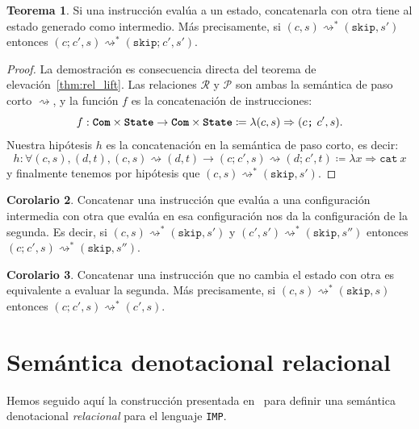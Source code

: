 \documentclass[
  a4paper, 
  10pt, 
  parskip=half, 
  toc=bibliography,
]{scrbook}
\theoremstyle{definition}
\theoremstyle{bolddef}
\newtheorem{theorem}{Teorema}[section]
\newtheorem{corollary}[theorem]{Corolario}
\newcommand{\funfont}[1]{\texttt{#1}}
\newcommand{\tyfont}[1]{\texttt{\textbf{#1}}}
\renewcommand{\mapsto}{\Rightarrow}
\newcommand{\ImpConcat}[2]{{#1} \texttt{;} \ {#2}}
\newcommand{\ImpSkip}{\texttt{skip}}
\newcommand{\ImpName}{\texttt{IMP}}
\begin{document}
\begin{theorem}
  Si una instrucción evalúa a un estado, concatenarla con otra tiene al estado 
  generado como intermedio. Más precisamente, si \((c, s) \rightsquigarrow^* (\ImpSkip, s')\)
  entonces \((\ImpConcat{c}{c'}, s) \rightsquigarrow^* (\ImpConcat{\ImpSkip}{c'}, s')\).
\end{theorem}

\begin{proof}
  La demostración es consecuencia directa del teorema de elevación~\ref{thm:rel_lift}.
  Las relaciones \(\mathcal{R}\) y \(\mathcal{P}\) son ambas la semántica de paso corto
  \(\rightsquigarrow\), y la función \(f\) es la concatenación de instrucciones:
  \[f: \tyfont{Com} \times \tyfont{State} \to \tyfont{Com} \times \tyfont{State} \coloneqq \lambda (c, s) \mapsto (\ImpConcat{c}{c'}, s).\]
  Nuestra hipótesis \(h\) es la concatenación en la semántica de paso corto, es decir:
  \[h: \forall (c, s), (d, t), (c, s) \rightsquigarrow (d, t) \to (\ImpConcat{c}{c'}, s) \rightsquigarrow (\ImpConcat{d}{c'}, t)
     \coloneqq \lambda x \mapsto \funfont{cat} \ x\]
  y finalmente tenemos por hipótesis que \((c, s) \rightsquigarrow^* (\ImpSkip, s')\).
\end{proof}

\begin{corollary}
  Concatenar una instrucción que evalúa a una configuración intermedia con otra
  que evalúa en esa configuración nos da la configuración de la segunda.
  Es decir, si \((c, s) \rightsquigarrow^* (\ImpSkip, s')\)
  y \((c', s') \rightsquigarrow^* (\ImpSkip, s'')\) entonces
  \((\ImpConcat{c}{c'}, s) \rightsquigarrow^* (\ImpSkip, s'')\).
\end{corollary}

\begin{corollary}
  Concatenar una instrucción que no cambia el estado con otra es equivalente a 
  evaluar la segunda. Más precisamente, si \((c, s) \rightsquigarrow^* (\ImpSkip, s)\) entonces
  \((\ImpConcat{c}{c'}, s) \rightsquigarrow^* (c', s)\).
\end{corollary}

\section{Semántica denotacional relacional}

Hemos seguido aquí la construcción presentada en~\cite[Capítulo~11]{semantics_with_isabelle}
para definir una semántica denotacional \emph{relacional} para el lenguaje \ImpName.
\end{document}
